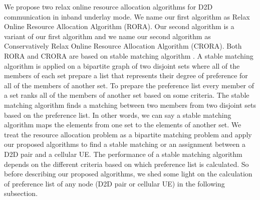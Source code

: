 \documentclass[times]{dacauth}
\begin{document}
\noindent
We propose two relax online resource allocation algorithms for D2D communication in inband underlay mode. We name our first algorithm as Relax Online Resource Allocation Algorithm (RORA). Our second algorithm is a variant of our first algorithm and we name our second algorithm as Conservatively Relax Online Resource Allocation Algorithm (CRORA). Both RORA and CRORA are based on stable matching algorithm \cite{knuth1976mariages}. A stable matching algorithm is applied on a bipartite graph of two disjoint sets where all of the members of each set prepare a list that represents their degree of preference for all of the members of another set. To prepare the preference list every member of a set ranks all of the members of another set based on some criteria. The stable matching algorithm finds a matching between two members from two disjoint sets based on the preference list. In other words, we can say a stable matching algorithm maps the elements from one set to the elements of another set. We treat the resource allocation problem as a bipartite matching problem and apply our proposed algorithms to find a stable matching or an assignment between a D2D pair and a cellular UE. The performance of a stable matching algorithm depends on the different criteria based on which preference list is calculated. So before describing our proposed algorithms, we shed some light on the calculation of preference list of any node (D2D pair or cellular UE) in the following subsection.  



\end{document}
